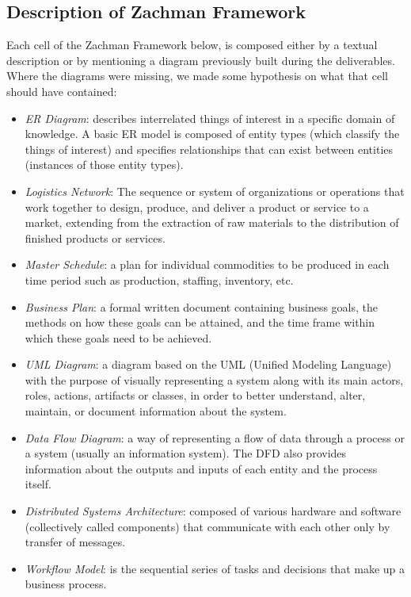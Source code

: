 \documentclass[../main.tex]{subfiles}
\begin{document}
    \subsection{Description of Zachman Framework}
    Each cell of the Zachman Framework below, is composed either by a textual description or by mentioning a diagram previously built during the deliverables.
    Where the diagrams were missing, we made some hypothesis on what that cell should have contained:
    \begin{itemize}
        \item \textit{ER Diagram}: describes interrelated things of interest in a specific domain of knowledge. A basic ER model is composed of entity types (which classify the things of interest) and specifies relationships that can exist between entities (instances of those entity types).
        \item \textit{Logistics Network}: The sequence or system of organizations or operations that work together to design, produce, and deliver a product or service to a market, extending from the extraction of raw materials to the distribution of finished products or services.
        \item \textit{Master Schedule}: a plan for individual commodities to be produced in each time period such as production, staffing, inventory, etc.
        \item \textit{Business Plan}: a formal written document containing business goals, the methods on how these goals can be attained, and the time frame within which these goals need to be achieved.
        \item \textit{UML Diagram}: a diagram based on the UML (Unified Modeling Language) with the purpose of visually representing a system along with its main actors, roles, actions, artifacts or classes, in order to better understand, alter, maintain, or document information about the system.
        \item \textit{Data Flow Diagram}: a way of representing a flow of data through a process or a system (usually an information system). The DFD also provides information about the outputs and inputs of each entity and the process itself.
        \item \textit{Distributed Systems Architecture}: composed of various hardware and software (collectively called components) that communicate with each other only by transfer of messages.
        \item \textit{Workflow Model}: is the sequential series of tasks and decisions that make up a business process.

\end{itemize}
\end{document}
